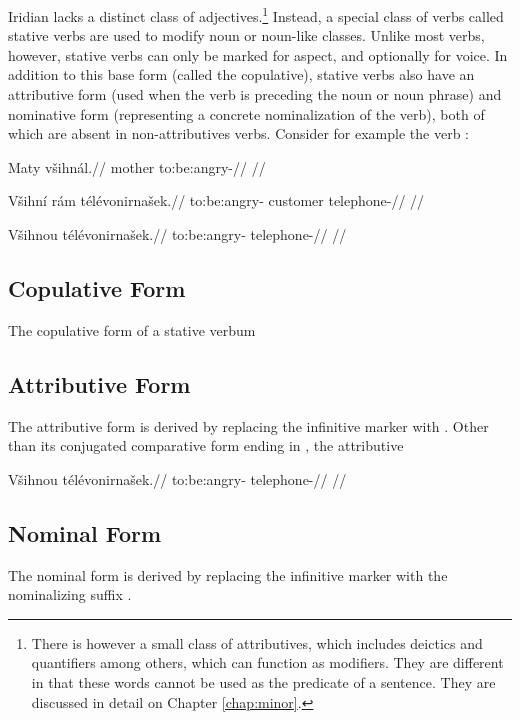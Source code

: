 Iridian lacks a distinct class of adjectives.\footnote{There is however a small class of attributives, which includes deictics and quantifiers among others, which can function as modifiers. They are different in that these words cannot be used as the predicate of a sentence. They are discussed in detail on Chapter \ref{chap:minor}.} Instead, a special class of verbs called stative verbs are used to modify noun or noun-like classes. Unlike most verbs, however, stative verbs can only be marked for aspect, and optionally for voice. In addition to this base form (called the copulative), stative verbs also have an attributive form (used when the verb is preceding the noun or noun phrase) and nominative form (representing a concrete nominalization of the verb), both of which are absent in non-attributives verbs. Consider for example the verb  :

\pex
\a
\begingl
\gla Maty v\v{s}ihn\'al.//
\glb mother to:be:angry-//
\glft {}//
\endgl

\a
\begingl
\gla V\v{s}ihn\'i r\'am t\'el\'evonirna\v{s}ek.//
\glb to:be:angry- customer telephone-//
\glft {}//
\endgl

\a
\begingl
\gla V\v{s}ihnou t\'el\'evonirna\v{s}ek.//
\glb to:be:angry- telephone-//
\glft {}//
\endgl

\xe

\subsection{Copulative Form}
The copulative form of a stative verbum

\subsection{Attributive Form}
The attributive form is derived by replacing the infinitive marker  with . Other than its conjugated comparative form ending in , the attributive

\ex
\begingl
\gla V\v{s}ihnou t\'el\'evonirna\v{s}ek.//
\glb to:be:angry- telephone-//
\glft {}//
\endgl

\xe


\subsection{Nominal Form}
The nominal form is derived by replacing the infinitive marker  with the nominalizing suffix .




